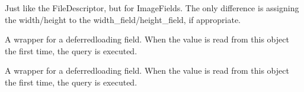 \documentclass[letterpaper,10pt,french]{sphinxmanual}
\begin{document}
\begin{fulllineitems}
\begin{fulllineitems}
\end{fulllineitems}


\begin{fulllineitems}
\label{\detokenize{main/model:main.models.Personnel.objects}}
\pysigstartsignatures
{}
\pysigstopsignatures
\end{fulllineitems}


\begin{fulllineitems}
\label{\detokenize{main/model:main.models.Personnel.photo_passport}}
\pysigstartsignatures
{}
\pysigstopsignatures
\sphinxAtStartPar
Just like the FileDescriptor, but for ImageFields. The only difference is
assigning the width/height to the width\_field/height\_field, if appropriate.

\end{fulllineitems}


\begin{fulllineitems}
\label{\detokenize{main/model:main.models.Personnel.prefecture}}
\pysigstartsignatures
{}
\pysigstopsignatures
\sphinxAtStartPar
A wrapper for a deferred\sphinxhyphen{}loading field. When the value is read from this
object the first time, the query is executed.

\end{fulllineitems}


\begin{fulllineitems}
\label{\detokenize{main/model:main.models.Personnel.prenom}}
\pysigstartsignatures
{}
\pysigstopsignatures
\sphinxAtStartPar
A wrapper for a deferred\sphinxhyphen{}loading field. When the value is read from this
object the first time, the query is executed.


\end{fulllineitems}
\end{fulllineitems}
\end{document}
